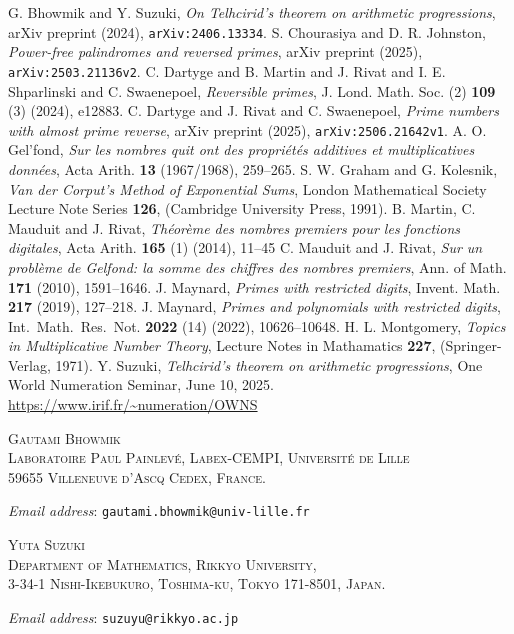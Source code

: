 \documentclass[hidelinks]{amsart}
\numberwithin{equation}{section}
\theoremstyle{plain}
\theoremstyle{definition}
\begin{document}
\begin{thebibliography}{99}
G. Bhowmik and Y. Suzuki,
\textit{{O}n {T}elhcirid's theorem on arithmetic progressions},
ar{X}iv preprint (2024), \texttt{arXiv:2406.13334}.
S. Chourasiya and D. R. Johnston,
\textit{{P}ower-free palindromes and reversed primes},
ar{X}iv preprint (2025),
\texttt{arXiv:2503.21136v2}.
C. Dartyge and B. Martin and J. Rivat and I. E. Shparlinski and C. Swaenepoel,
\textit{{R}eversible primes},
J. Lond. Math. Soc. (2) \textbf{109} (3) (2024), e12883.
C. Dartyge and J. Rivat and C. Swaenepoel,
\textit{{P}rime numbers with almost prime reverse},
ar{X}iv preprint (2025),
\texttt{arXiv:2506.21642v1}.
A. O. Gel'fond,
\textit{{S}ur les nombres quit ont des propri\'{e}t\'{e}s additives et multiplicatives donn\'{e}es},
Acta Arith. \textbf{13} (1967/1968),
259--265.
S. W. Graham and G. Kolesnik,
\textit{{V}an der {C}orput's {M}ethod of {E}xponential {S}ums},
London Mathematical Society Lecture Note Series \textbf{126},
(Cambridge University Press, 1991).
B. Martin, C. Mauduit and J. Rivat,
\textit{{T}h\'{e}or\`{e}me des nombres premiers pour les fonctions digitales},
Acta Arith. \textbf{165} (1) (2014), 11--45
C. Mauduit and J. Rivat,
\textit{{S}ur un probl\`{e}me de {G}elfond: la somme des chiffres des nombres premiers},
Ann. of Math. \textbf{171} (2010), 1591--1646.
J. Maynard,
\textit{{P}rimes with restricted digits},
Invent. Math. \textbf{217} (2019),
127--218.
J. Maynard,
\textit{{P}rimes and polynomials with restricted digits},
Int.\ Math.\ Res.\ Not. \textbf{2022} (14) (2022), 10626--10648.
H. L. Montgomery,
\textit{{T}opics in {M}ultiplicative {N}umber {T}heory},
Lecture Notes in Mathamatics \textbf{227},
(Springer-Verlag, 1971).
Y. Suzuki,
\textit{{T}elhcirid's theorem on arithmetic progressions},
One World Numeration Seminar, June 10, 2025.
\url{https://www.irif.fr/~numeration/OWNS}
\end{thebibliography}
\vspace{10mm}

\noindent
{\textsc{%
\small
Gautami Bhowmik\\[.3em]
\footnotesize
Laboratoire Paul Painlev\'{e}, Labex-CEMPI, Universit\'{e} de Lille\\
59655 Villeneuve d'Ascq Cedex, France.
}

\noindent
\small
\textit{Email address}: \texttt{gautami.bhowmik@univ-lille.fr}
}
\bigskip

\noindent
{\textsc{%
\small
Yuta Suzuki\\[.3em]
\footnotesize
Department of Mathematics, Rikkyo University,\\
3-34-1 Nishi-Ikebukuro, Toshima-ku, Tokyo 171-8501, Japan.
}

\noindent
\small
\textit{Email address}: \texttt{suzuyu@rikkyo.ac.jp}
}
\end{document}
